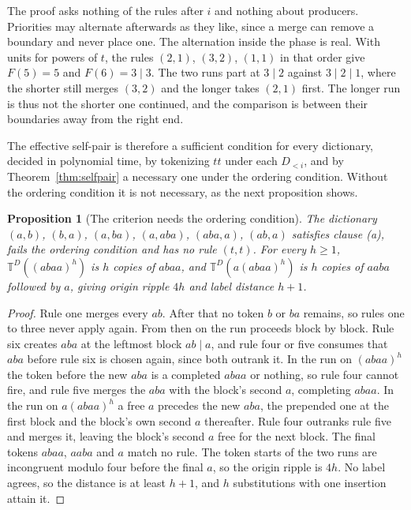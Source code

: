 \documentclass[11pt,a4paper]{article}
\theoremstyle{definition}
\theoremstyle{plain}
\newtheorem{proposition}{Proposition}
\newcommand{\T}{\mathbb{T}}
\begin{document}
The proof asks nothing of the rules after \(i\) and nothing about producers. Priorities may alternate afterwards as they
like, since a merge can remove a boundary and never place one. The alternation inside the phase is real. With units for
powers of \(t\), the rules \((2, 1)\), \((3, 2)\), \((1, 1)\) in that order give \(F(5) = 5\) and \(F(6) = 3 \mid 3\).
The two runs part at \(3 \mid 2\) against \(3 \mid 2 \mid 1\), where the shorter still merges \((3, 2)\) and the longer
takes \((2, 1)\) first. The longer run is thus not the shorter one continued, and the comparison is between their
boundaries away from the right end.

The effective self-pair is therefore a sufficient condition for every dictionary, decided in polynomial time, by
tokenizing \(tt\) under each \(D_{<i}\), and by Theorem~\ref{thm:selfpair} a necessary one under the ordering condition.
Without the ordering condition it is not necessary, as the next proposition shows.


\begin{proposition}[The criterion needs the ordering condition]\label{prop:noselfpair}
The dictionary \((a,b)\), \((b,a)\), \((a,ba)\), \((a,aba)\), \((aba,a)\), \((ab,a)\) satisfies clause (a), fails the
ordering condition and has no rule \((t, t)\). For every \(h \ge 1\), \(\T^D((abaa)^h)\) is \(h\) copies of \(abaa\),
and \(\T^D(a(abaa)^h)\) is \(h\) copies of \(aaba\) followed by \(a\), giving origin ripple \(4h\) and label distance
\(h + 1\).
\end{proposition}

\begin{proof}
Rule one merges every \(ab\). After that no token \(b\) or \(ba\) remains, so rules one to three never apply again. From
then on the run proceeds block by block. Rule six creates \(aba\) at the leftmost block \(ab \mid a\), and rule four or
five consumes that \(aba\) before rule six is chosen again, since both outrank it. In the run on \((abaa)^h\) the token
before the new \(aba\) is a completed \(abaa\) or nothing, so rule four cannot fire, and rule five merges the \(aba\)
with the block's second \(a\), completing \(abaa\). In the run on \(a(abaa)^h\) a free \(a\) precedes the new \(aba\),
the prepended one at the first block and the block's own second \(a\) thereafter. Rule four outranks rule five and
merges it, leaving the block's second \(a\) free for the next block. The final tokens \(abaa\), \(aaba\) and \(a\) match
no rule. The token starts of the two runs are incongruent modulo four before the final \(a\), so the origin ripple is
\(4h\). No label agrees, so the distance is at least \(h + 1\), and \(h\) substitutions with one insertion attain it.
\end{proof}
\end{document}
